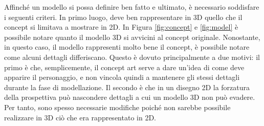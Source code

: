 Affinché un modello si possa definire ben fatto e ultimato, è necessario soddisfare i seguenti criteri.
In primo luogo, deve ben rappresentare in 3D quello che il concept si limitava a mostrare in 2D.
In Figura \ref{fig:concept} e \ref{fig:model} è possibile notare quanto il modello 3D si avvicini al concept originale.
Nonostante, in questo caso, il modello rappresenti molto bene il concept, è possibile notare come alcuni dettagli differiscano.
Questo è dovuto principalmente a due motivi: il primo è che, semplicemente, il concept art serve a dare un'idea di come deve apparire il personaggio, e non vincola quindi a mantenere gli stessi dettagli durante la fase di modellazione.
Il secondo è che in un disegno 2D la forzatura della prospettiva può nascondere dettagli a cui un modello 3D non può evadere.
Per tanto, sono spesso necessarie modifiche poiché non sarebbe possibile realizzare in 3D ciò che era rappresentato in 2D.

